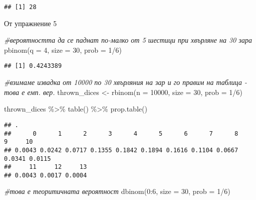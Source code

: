 \documentclass[
]{article}
\newenvironment{Shaded}{\begin{snugshade}}{\end{snugshade}}
\newcommand{\AttributeTok}[1]{\textcolor[rgb]{0.77,0.63,0.00}{#1}}
\newcommand{\CommentTok}[1]{\textcolor[rgb]{0.56,0.35,0.01}{\textit{#1}}}
\newcommand{\DecValTok}[1]{\textcolor[rgb]{0.00,0.00,0.81}{#1}}
\newcommand{\FunctionTok}[1]{\textcolor[rgb]{0.00,0.00,0.00}{#1}}
\newcommand{\NormalTok}[1]{#1}
\newcommand{\OtherTok}[1]{\textcolor[rgb]{0.56,0.35,0.01}{#1}}
\newcommand{\SpecialCharTok}[1]{\textcolor[rgb]{0.00,0.00,0.00}{#1}}
\begin{document}
\begin{verbatim}
## [1] 28
\end{verbatim}

От упражнение 5

\begin{Shaded}
\begin{Highlighting}[]
\CommentTok{\#вероятността да се паднат по{-}малко от 5 шестици при хвърляне на 30 зара}
\FunctionTok{pbinom}\NormalTok{(}\AttributeTok{q =} \DecValTok{4}\NormalTok{, }\AttributeTok{size =} \DecValTok{30}\NormalTok{, }\AttributeTok{prob =} \DecValTok{1}\SpecialCharTok{/}\DecValTok{6}\NormalTok{) }
\end{Highlighting}
\end{Shaded}

\begin{verbatim}
## [1] 0.4243389
\end{verbatim}

\begin{Shaded}
\begin{Highlighting}[]
\CommentTok{\#взимаме извадка от 10000 по 30 хвърляния на зар и го правим на таблица {-} това е емп. вер.}
\NormalTok{thrown\_dices }\OtherTok{\textless{}{-}} \FunctionTok{rbinom}\NormalTok{(}\AttributeTok{n =} \DecValTok{10000}\NormalTok{, }\AttributeTok{size =} \DecValTok{30}\NormalTok{, }\AttributeTok{prob =} \DecValTok{1}\SpecialCharTok{/}\DecValTok{6}\NormalTok{)}

\NormalTok{thrown\_dices }\SpecialCharTok{\%\textgreater{}\%} \FunctionTok{table}\NormalTok{() }\SpecialCharTok{\%\textgreater{}\%} \FunctionTok{prop.table}\NormalTok{()}
\end{Highlighting}
\end{Shaded}

\begin{verbatim}
## .
##      0      1      2      3      4      5      6      7      8      9     10 
## 0.0043 0.0242 0.0717 0.1355 0.1842 0.1894 0.1616 0.1104 0.0667 0.0341 0.0115 
##     11     12     13 
## 0.0043 0.0017 0.0004
\end{verbatim}

\begin{Shaded}
\begin{Highlighting}[]
\CommentTok{\#това е теоритичната вероятност}
\FunctionTok{dbinom}\NormalTok{(}\DecValTok{0}\SpecialCharTok{:}\DecValTok{6}\NormalTok{, }\AttributeTok{size =} \DecValTok{30}\NormalTok{, }\AttributeTok{prob =} \DecValTok{1}\SpecialCharTok{/}\DecValTok{6}\NormalTok{)}
\end{Highlighting}
\end{Shaded}
\end{document}
